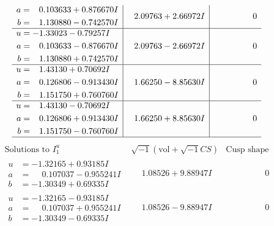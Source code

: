 \documentclass[1p]{elsarticle_modified}
\theoremstyle{definition}
\newcommand{\I}{\sqrt{-1}}
\begin{document}
$$\begin{array}{c|c|c}
\begin{aligned}
a &= \phantom{-}0.103633 + 0.876670 I \\
b &= \phantom{-}1.130880 - 0.742570 I\end{aligned}
 & \phantom{-}2.09763 + 2.66972 I & \phantom{-0.000000 } 0 \\ \hline\begin{aligned}
u &= -1.33023 - 0.79257 I \\
a &= \phantom{-}0.103633 - 0.876670 I \\
b &= \phantom{-}1.130880 + 0.742570 I\end{aligned}
 & \phantom{-}2.09763 - 2.66972 I & \phantom{-0.000000 } 0 \\ \hline\begin{aligned}
u &= \phantom{-}1.43130 + 0.70692 I \\
a &= \phantom{-}0.126806 - 0.913430 I \\
b &= \phantom{-}1.151750 + 0.760760 I\end{aligned}
 & \phantom{-}1.66250 - 8.85630 I & \phantom{-0.000000 } 0 \\ \hline\begin{aligned}
u &= \phantom{-}1.43130 - 0.70692 I \\
a &= \phantom{-}0.126806 + 0.913430 I \\
b &= \phantom{-}1.151750 - 0.760760 I\end{aligned}
 & \phantom{-}1.66250 + 8.85630 I & \phantom{-0.000000 } 0\\
 \hline 
 \end{array}$$\newpage$$\begin{array}{c|c|c}  
\text{Solutions to }I^u_{1}& \I (\text{vol} + \sqrt{-1}CS) & \text{Cusp shape}\\
 \hline 
\begin{aligned}
u &= -1.32165 + 0.93185 I \\
a &= \phantom{-}0.107037 - 0.955241 I \\
b &= -1.30349 + 0.69335 I\end{aligned}
 & \phantom{-}1.08526 + 9.88947 I & \phantom{-0.000000 } 0 \\ \hline\begin{aligned}
u &= -1.32165 - 0.93185 I \\
a &= \phantom{-}0.107037 + 0.955241 I \\
b &= -1.30349 - 0.69335 I\end{aligned}
 & \phantom{-}1.08526 - 9.88947 I & \phantom{-0.000000 } 0 \\ \hline\begin{aligned}

\end{aligned}
\end{array}$$
\end{document}
